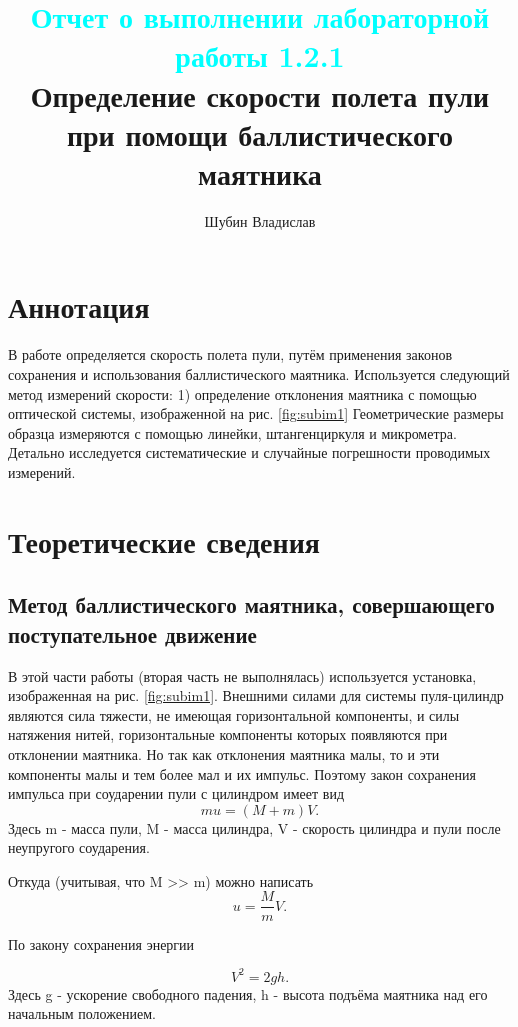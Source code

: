 \documentclass[
	a4paper, %
	12pt, %
]{article}
\title{
	\textcolor{cyan}{Отчет о выполнении лабораторной работы 1.2.1}
	\\
	Определение скорости полета пули при помощи баллистического маятника
}
\author{Шубин Владислав}
\begin{document}
    
	
	\maketitle
	
	\section{Аннотация}
	В работе определяется скорость полета пули, путём применения законов сохранения и использования баллистического маятника. Используется следующий метод измерений скорости: 1) определение отклонения маятника с помощью оптической системы, изображенной на рис. \ref{fig:subim1} Геометрические размеры образца измеряются с помощью линейки, штангенциркуля и микрометра. Детально исследуется систематические и случайные погрешности проводимых измерений.
	
	
	\section{Теоретические сведения}
	
	\subsection{Метод баллистического маятника, совершающего поступательное движение}
	
	В этой части работы (вторая часть не выполнялась) используется установка, изображенная на рис. \ref{fig:subim1}. Внешними силами для системы пуля-цилиндр являются сила тяжести, не имеющая горизонтальной компоненты, и силы натяжения нитей, горизонтальные компоненты которых появляются при отклонении маятника. Но так как отклонения маятника малы, то и эти компоненты малы и тем более мал и их импульс. Поэтому закон сохранения импульса при соударении пули с цилиндром имеет вид
	\begin{equation}
		mu = (M + m)V.
	\end{equation}
	Здесь m - масса пули, M - масса цилиндра, V - скорость цилиндра и пули после неупругого соударения.
	
	Откуда (учитывая, что M >> m) можно написать
	\begin{equation}
		u = \frac{M}{m}V.
	\end{equation}
	
	По закону сохранения энергии
	
	\begin{equation}
		V^2 = 2gh.
	\end{equation}
	Здесь g - ускорение свободного падения, h - высота подъёма маятника над его начальным положением.
	
\end{document}
